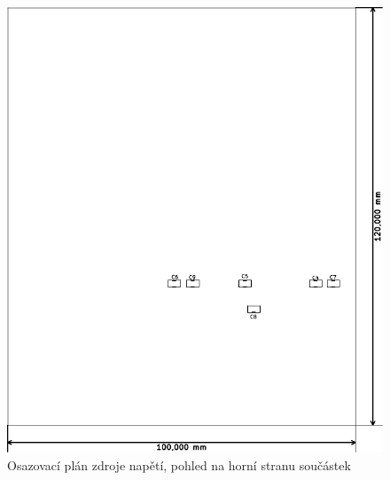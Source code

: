 \begin{figure}[H]
	\centering
	\includegraphics[width=170mm]{img/zdroj/os_b.pdf}
	\caption{Osazovací plán zdroje napětí, pohled na horní stranu součástek}    		
\end{figure}

